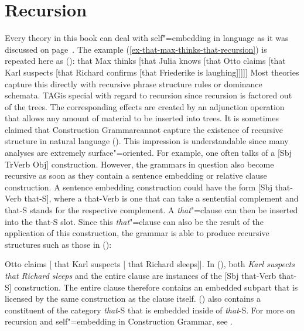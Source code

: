 \section{Recursion}
\label{sec-recursion}

Every theory in this book can deal with self"=embedding in language as it was
discussed on page~\pageref{ex-that-max-thinks-that-recursion}. The example
(\ref{ex-that-max-thinks-that-recursion}) is repeated here as ():
\ea
\label{ex-that-max-thinks-that-recursion-two}
that Max thinks [that Julia knows [that Otto claims [that Karl
suspects [that Richard confirms [that Friederike is laughing]]]]]
\z
Most theories
capture this directly with recursive phrase structure rules or dominance schemata. TAG\indextag is
special with regard to recursion since recursion is factored out of the trees. The corresponding
effects are created by an adjunction operation that allows any amount of material to be inserted
into trees.  It is sometimes claimed that Construction Grammar\indexcxg cannot capture the existence
of recursive structure in natural language (\eg \citealp[]{Leiss2009a}).  This impression
is understandable since many analyses are extremely surface"=oriented. For example, one often talks
of a [Sbj TrVerb Obj] construction. However, the grammars in question also become recursive as soon
as they contain a sentence embedding or relative clause construction. A sentence embedding
construction could have the form [Sbj that-Verb that-S], where a that-Verb is one that can take
a sentential complement and that-S stands for the respective complement. A \emph{that}"=clause can then be inserted
into the that-S slot. Since this \emph{that}"=clause can also be the result of the application of
this construction, the grammar is able to produce recursive structures such as those in ():

\ea
Otto claims [ that Karl suspects [ that Richard sleeps]].
\z
In (), both \emph{Karl suspects that Richard sleeps} and the entire clause are instances of the [Sbj
that-Verb that-S] construction. The entire clause therefore contains an embedded subpart that is licensed by
the same construction as the clause itself. () also contains a constituent of the category
\emph{that}-S that is embedded inside of \emph{that}-S. For more on recursion and self"=embedding in Construction Grammar, see .

